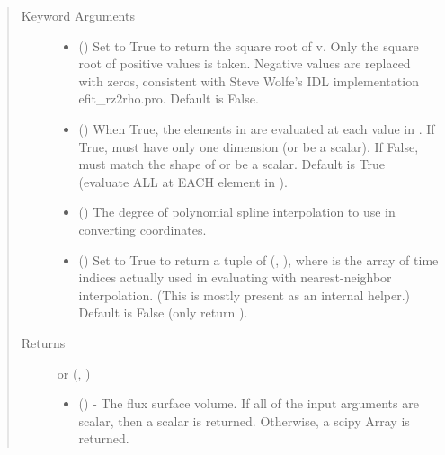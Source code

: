 \documentclass[letterpaper,10pt,english]{sphinxmanual}
\begin{document}
\begin{fulllineitems}
\begin{fulllineitems}
\begin{quote}
\begin{description}
\begin{itemize}
\end{itemize}

\item[{Keyword Arguments}] \leavevmode\begin{itemize}
\item {} 
 () \textendash{} Set to True to return the square root of v.
Only the square root of positive values is taken. Negative
values are replaced with zeros, consistent with Steve Wolfe’s
IDL implementation efit\_rz2rho.pro. Default is False.

\item {} 
 () \textendash{} When True, the elements in  are evaluated
at each value in . If True,  must have only one dimension
(or be a scalar). If False,  must match the shape of 
or be a scalar. Default is True (evaluate ALL  at EACH
element in ).

\item {} 
 () \textendash{} The degree of polynomial spline interpolation to
use in converting coordinates.

\item {} 
 () \textendash{} Set to True to return a tuple of (,
), where  is the array of time indices
actually used in evaluating  with nearest-neighbor
interpolation. (This is mostly present as an internal helper.)
Default is False (only return ).

\end{itemize}

\item[{Returns}] \leavevmode

 or (, )
\begin{itemize}
\item {} 
 () - The flux surface volume. If
all of the input arguments are scalar, then a scalar is returned.
Otherwise, a scipy Array is returned.


\end{itemize}
\end{description}
\end{quote}
\end{fulllineitems}
\end{fulllineitems}
\end{document}
